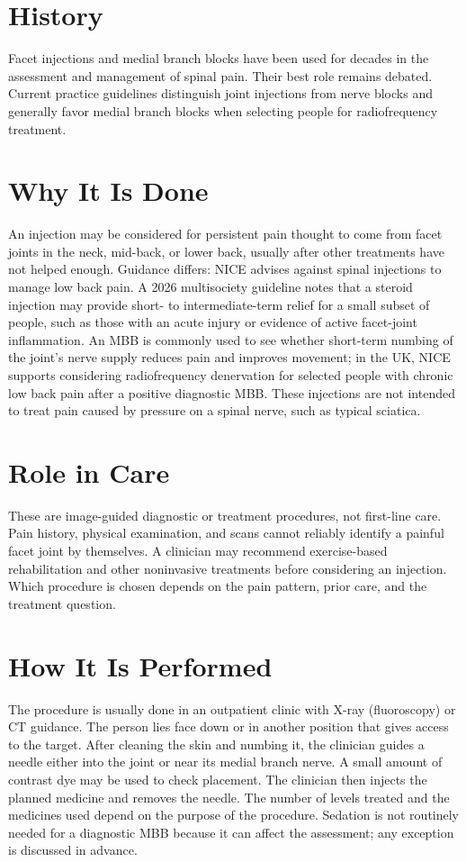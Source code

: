 \section*{History}
Facet injections and medial branch blocks have been used for decades in the assessment and management of spinal pain. Their best role remains debated. Current practice guidelines distinguish joint injections from nerve blocks and generally favor medial branch blocks when selecting people for radiofrequency treatment.

\section*{Why It Is Done}
An injection may be considered for persistent pain thought to come from facet joints in the neck, mid-back, or lower back, usually after other treatments have not helped enough. Guidance differs: NICE advises against spinal injections to manage low back pain. A 2026 multisociety guideline notes that a steroid injection may provide short- to intermediate-term relief for a small subset of people, such as those with an acute injury or evidence of active facet-joint inflammation. An MBB is commonly used to see whether short-term numbing of the joint's nerve supply reduces pain and improves movement; in the UK, NICE supports considering radiofrequency denervation for selected people with chronic low back pain after a positive diagnostic MBB. These injections are not intended to treat pain caused by pressure on a spinal nerve, such as typical sciatica.

\section*{Role in Care}
These are image-guided diagnostic or treatment procedures, not first-line care. Pain history, physical examination, and scans cannot reliably identify a painful facet joint by themselves. A clinician may recommend exercise-based rehabilitation and other noninvasive treatments before considering an injection. Which procedure is chosen depends on the pain pattern, prior care, and the treatment question.

\section*{How It Is Performed}
The procedure is usually done in an outpatient clinic with X-ray (fluoroscopy) or CT guidance. The person lies face down or in another position that gives access to the target. After cleaning the skin and numbing it, the clinician guides a needle either into the joint or near its medial branch nerve. A small amount of contrast dye may be used to check placement. The clinician then injects the planned medicine and removes the needle. The number of levels treated and the medicines used depend on the purpose of the procedure. Sedation is not routinely needed for a diagnostic MBB because it can affect the assessment; any exception is discussed in advance.

